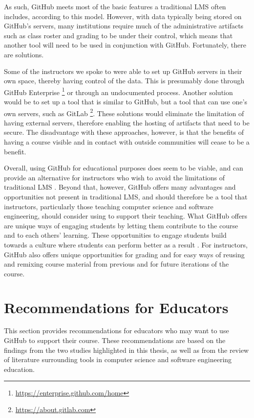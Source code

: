 As such, GitHub meets most of the basic features a traditional LMS often includes, according to this model. However, with data typically being stored on GitHub's servers, many institutions require much of the administrative artifacts such as class roster and grading to be under their control, which means that another tool will need to be used in conjunction with GitHub. Fortunately, there are solutions.

Some of the instructors we spoke to were able to set up GitHub servers in their own space, thereby having control of the data. This is presumably done through GitHub Enterprise \footnote{\url{https://enterprise.github.com/home}} or through an undocumented process. Another solution would be to set up a tool that is similar to GitHub, but a tool that can use one's own servers, such as GitLab \footnote{\url{https://about.gitlab.com}}. These solutions would eliminate the limitation of having external servers, therefore enabling the hosting of artifacts that need to be secure. The disadvantage with these approaches, however, is that the benefits of having a course visible and in contact with outside communities will cease to be a benefit.

Overall, using GitHub for educational purposes does seem to be viable, and can provide an alternative for instructors who wish to avoid the limitations of traditional LMS \cite{garcia2011opening}. Beyond that, however, GitHub offers many advantages and opportunities not present in traditional LMS, and should therefore be a tool that instructors, particularly those teaching computer science and software engineering, should consider using to support their teaching. What GitHub offers are unique ways of engaging students by letting them contribute to the course and to each others' learning. These opportunities to engage students build towards a culture where students can perform better as a result \cite{kuh2001assessing}. For instructors, GitHub also offers unique opportunities for grading and for easy ways of reusing and remixing course material from previous and for future iterations of the course.

\section{Recommendations for Educators}
This section provides recommendations for educators who may want to use GitHub to support their course. These recommendations are based on the findings from the two studies highlighted in this thesis, as well as from the review of literature surrounding tools in computer science and software engineering education.

